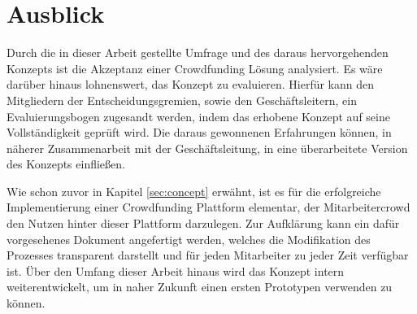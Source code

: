 \section{Ausblick}

Durch die in dieser Arbeit gestellte Umfrage und des daraus hervorgehenden Konzepts ist die Akzeptanz einer Crowdfunding Lösung analysiert. Es wäre darüber hinaus lohnenswert, das Konzept zu evaluieren. Hierfür kann den Mitgliedern der Entscheidungsgremien, sowie den Geschäftsleitern, ein Evaluierungsbogen zugesandt werden, indem das erhobene Konzept auf seine Vollständigkeit geprüft wird. Die daraus gewonnenen Erfahrungen können, in näherer Zusammenarbeit mit der Geschäftsleitung, in eine überarbeitete Version des Konzepts einfließen. 

Wie schon zuvor in Kapitel \ref{sec:concept} erwähnt, ist es für die erfolgreiche Implementierung einer Crowdfunding Plattform elementar, der Mitarbeitercrowd den Nutzen hinter dieser Plattform darzulegen. Zur Aufklärung kann ein dafür vorgesehenes Dokument angefertigt werden, welches die Modifikation des Prozesses transparent darstellt und für jeden Mitarbeiter zu jeder Zeit verfügbar ist. Über den Umfang dieser Arbeit hinaus wird das Konzept intern weiterentwickelt, um in naher Zukunft einen ersten Prototypen verwenden zu können.
